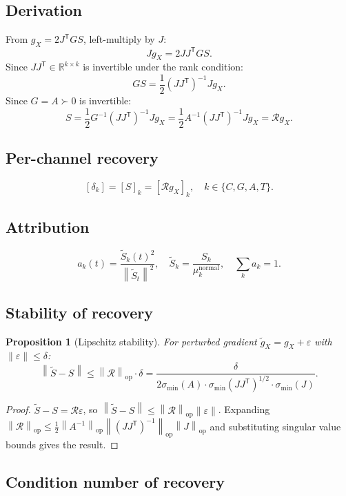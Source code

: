 \documentclass[11pt,a4paper]{article}
\newtheorem{proposition}[theorem]{Proposition}
\theoremstyle{definition}
\newcommand{\R}{\mathbb{R}}
\newcommand{\T}{^{\mathsf{T}}}
\newcommand{\norm}[1]{\left\|#1\right\|}
\newcommand{\gX}{g_X}
\begin{document}
\subsection{Derivation}

From $\gX = 2J\T GS$, left-multiply by $J$:
\[
J\gX = 2JJ\T GS.
\]
Since $JJ\T \in \R^{k\times k}$ is invertible under the rank condition:
\[
GS = \frac{1}{2}(JJ\T)^{-1}J\gX.
\]
Since $G = A \succ 0$ is invertible:
\[
S = \frac{1}{2}G^{-1}(JJ\T)^{-1}J\gX = \frac{1}{2}A^{-1}(JJ\T)^{-1}J\gX = \mathcal{R}\gX.
\]

\subsection{Per-channel recovery}

\[
[\delta_k] = [S]_k = [\mathcal{R}\gX]_k, \quad k \in \{C,G,A,T\}.
\]

\subsection{Attribution}

\[
a_k(t) = \frac{\tilde S_k(t)^2}{\norm{\tilde S_t}^2}, \quad \tilde S_k = \frac{S_k}{\mu_k^\text{normal}}, \quad \sum_k a_k = 1.
\]

\subsection{Stability of recovery}

\begin{proposition}[Lipschitz stability]
For perturbed gradient $\tilde\gX = \gX + \varepsilon$ with $\norm{\varepsilon} \leq \delta$:
\[
\norm{\tilde S - S} \leq \norm{\mathcal{R}}_\mathrm{op}\cdot\delta = \frac{\delta}{2\sigma_{\min}(A)\cdot\sigma_{\min}(JJ\T)^{1/2}\cdot\sigma_{\min}(J)}.
\]
\end{proposition}

\begin{proof}
$\tilde S - S = \mathcal{R}\varepsilon$, so $\norm{\tilde S - S} \leq \norm{\mathcal{R}}_\mathrm{op}\norm{\varepsilon}$.
Expanding $\norm{\mathcal{R}}_\mathrm{op} \leq \frac{1}{2}\norm{A^{-1}}_\mathrm{op}\norm{(JJ\T)^{-1}}_\mathrm{op}\norm{J}_\mathrm{op}$
and substituting singular value bounds gives the result.
\end{proof}

\subsection{Condition number of recovery}
\end{document}
